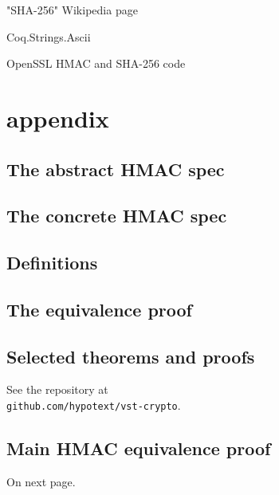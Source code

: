 \documentclass[twocolumn,showpacs,%
  nofootinbib,aps,superscriptaddress,%
  eqsecnum,prd,notitlepage,showkeys,10pt]{revtex4-1}
\begin{document}
"SHA-256" Wikipedia page

Coq.Strings.Ascii

OpenSSL HMAC and SHA-256 code


\section{appendix}

\subsection{The abstract HMAC spec}



\subsection{The concrete HMAC spec}



\subsection{Definitions}







\subsection{The equivalence proof}



\subsection{Selected theorems and proofs}

See the repository at \\ \verb|github.com/hypotext/vst-crypto|.

\subsection{Main HMAC equivalence proof}
On next page.
\end{document}
